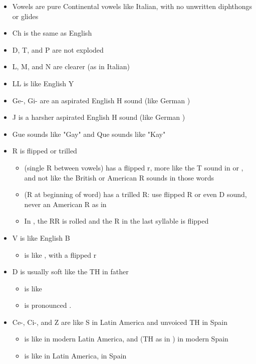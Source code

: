 \begin{itemize}
    \item Vowels are pure Continental vowels like Italian, with no unwritten
        diphthongs or glides
    \item Ch is the same as English
    \item D, T, and P are not exploded
    \item L, M, and N are clearer (as in Italian)
    \item LL is like English Y
    \item Ge-, Gi- are an aspirated English H sound (like German )
    \item J is a harsher aspirated English H sound (like German )
    \item Gue sounds like "Gay" and Que sounds like "Kay"
        \item R is flipped or trilled 
        \begin{itemize}
            \item {} (single R between vowels) has a flipped r, more
                like the T sound in  or , and not like the
                British or American R sounds in those words
            \item {} (R at beginning of word) has a trilled R: use
                flipped R or even D sound, never an American R as in
            \item In , the RR is rolled and the R in the last
                syllable is flipped
        \end{itemize}
    
    \item V is like English B
        \begin{itemize}
            \item {} is like , with a flipped r
        \end{itemize}

    \item D is usually soft like the TH in father
        \begin{itemize}
            \item {} is like  
            \item {} is pronounced .
        \end{itemize}

    
    \item Ce-, Ci-, and Z are like S in Latin America and unvoiced TH in Spain
        \begin{itemize}
            \item {} is like  in modern Latin America, 
                and  (TH as in ) in modern Spain
            \item {} is like  in Latin America,
                 in Spain
        \end{itemize}
\end{itemize}




